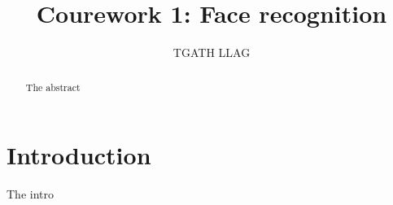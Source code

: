 \documentclass[10pt,technote]{IEEEtran}
\title{Courework 1: Face recognition }
\author{TGATH LLAG}
\begin{document}
\maketitle
\begin{abstract}
The abstract
\end{abstract}

\section{Introduction}

The intro
%
%
\end{document}
